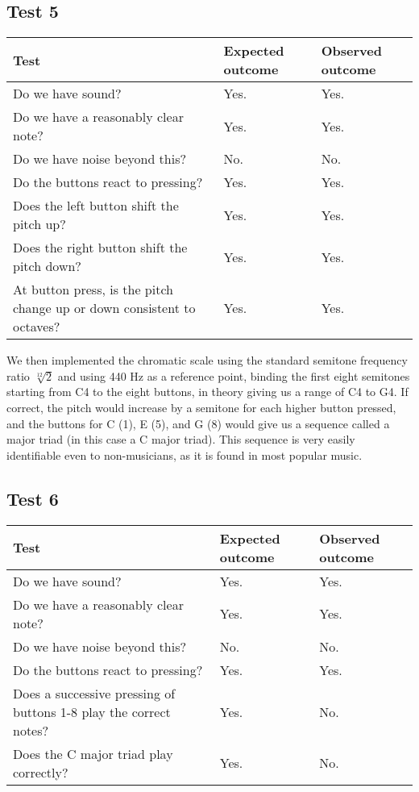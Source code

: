 \subsection*{Test 5}
\begin{center}
\begin{tabular}{|p{3.6cm}|p{3.6cm}|p{3.6cm}|}
\hline
{\sc Test} & {\sc Expected outcome} & {\sc Observed outcome}\\ \hline
Do we have sound? & Yes. & Yes. \\ \hline
Do we have a reasonably clear note? & Yes. & Yes. \\ \hline
Do we have noise beyond this? & No. & No. \\ \hline
Do the buttons react to pressing? & Yes. & Yes. \\ \hline
Does the left button shift the pitch up? & Yes. & Yes. \\ \hline
Does the right button shift the pitch down? & Yes. & Yes. \\ \hline
At button press, is the pitch change up or down consistent to octaves? &
Yes. & Yes. \\ \hline
\end{tabular}
\end{center}

We then implemented the chromatic scale using the standard semitone
frequency ratio $\sqrt[12]{2}$ and using 440 Hz as a reference
point, binding the first eight semitones starting from C4 to the eight
buttons, in theory giving us a range of C4 to G4. If correct, the pitch
would increase by a semitone for each higher button pressed, and the
buttons for C (1), E (5), and G (8) would give us a sequence called a
major triad (in this case a C major triad). This sequence is very easily identifiable even to
non-musicians, as it is found in most popular music.

\subsection*{Test 6}
\begin{center}
\begin{tabular}{|p{3.6cm}|p{3.6cm}|p{3.6cm}|}
\hline
{\sc Test} & {\sc Expected outcome} & {\sc Observed outcome}\\ \hline
Do we have sound? & Yes. & Yes.\\ \hline
Do we have a reasonably clear note? & Yes. & Yes. \\ \hline
Do we have noise beyond this? & No. & No. \\ \hline
Do the buttons react to pressing? & Yes. & Yes.\\ \hline
Does a successive pressing of buttons 1-8 play the correct notes? & Yes. & No.\\ \hline
Does the C major triad play correctly? & Yes. & No.\\ \hline
\end{tabular}
\end{center}


